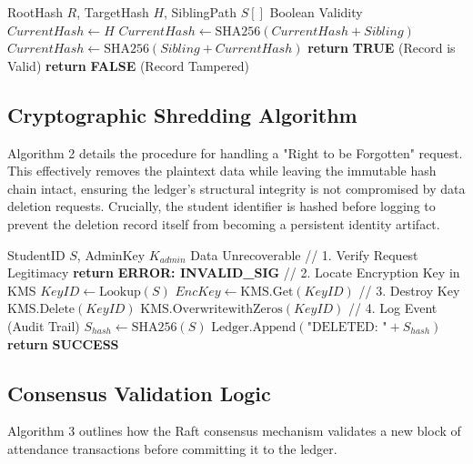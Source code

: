 \documentclass[conference]{IEEEtran}
\renewcommand{\RETURN}{\STATE \textbf{return} }
\begin{document}
\begin{algorithm}[H]
\caption{Merkle Proof Verification (Client Side)}
\begin{algorithmic}[1]
\REQUIRE RootHash $R$, TargetHash $H$, SiblingPath $S[]$
\ENSURE Boolean Validity
\STATE $CurrentHash \leftarrow H$
        \STATE $CurrentHash \leftarrow \text{SHA256}(CurrentHash + Sibling)$
    \ELSE
        \STATE $CurrentHash \leftarrow \text{SHA256}(Sibling + CurrentHash)$
    \ENDIF
\ENDFOR
{}
    \RETURN \textbf{TRUE} (Record is Valid)
\ELSE
    \RETURN \textbf{FALSE} (Record Tampered)
\ENDIF
\end{algorithmic}
\end{algorithm}

\subsection{Cryptographic Shredding Algorithm}
Algorithm 2 details the procedure for handling a "Right to be Forgotten" request. This effectively removes the plaintext data while leaving the immutable hash chain intact, ensuring the ledger's structural integrity is not compromised by data deletion requests. Crucially, the student identifier is hashed before logging to prevent the deletion record itself from becoming a persistent identity artifact.

\begin{algorithm}[H]
\caption{GDPR Deletion Request}
\begin{algorithmic}[1]
\REQUIRE StudentID $S$, AdminKey $K_{admin}$
\ENSURE Data Unrecoverable
\STATE // 1. Verify Request Legitimacy
    \RETURN \textbf{ERROR: INVALID\_SIG}
\ENDIF
\STATE // 2. Locate Encryption Key in KMS
\STATE $KeyID \leftarrow \text{Lookup}(S)$
\STATE $EncKey \leftarrow \text{KMS.Get}(KeyID)$
\STATE // 3. Destroy Key
\STATE $\text{KMS.Delete}(KeyID)$
\STATE $\text{KMS.OverwritewithZeros}(KeyID)$
\STATE // 4. Log Event (Audit Trail)
\STATE $S_{hash} \leftarrow \text{SHA256}(S)$
\STATE $\text{Ledger.Append}(\text{"DELETED: "} + S_{hash})$
\RETURN \textbf{SUCCESS}
\end{algorithmic}
\end{algorithm}

\subsection{Consensus Validation Logic}
Algorithm 3 outlines how the Raft consensus mechanism validates a new block of attendance transactions before committing it to the ledger.
\end{document}
